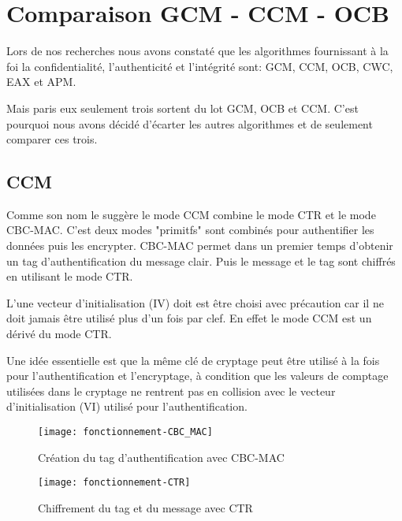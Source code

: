 \chapter{Comparaison GCM - CCM - OCB}

Lors de nos recherches nous avons constaté que les algorithmes fournissant à la foi la confidentialité, l'authenticité et l'intégrité sont: GCM, CCM, OCB, CWC, EAX et APM.

Mais paris eux seulement trois sortent du lot GCM, OCB et CCM. C'est pourquoi nous avons décidé d'écarter les autres algorithmes et de seulement comparer ces trois.

\section{CCM}

Comme son nom le suggère le mode CCM combine le mode CTR et le mode CBC-MAC. C'est deux modes "primitfs" sont combinés pour authentifier les données puis les encrypter. CBC-MAC permet dans un premier temps d'obtenir un tag d'authentification du message clair. Puis le message et le tag sont chiffrés en utilisant le mode CTR.



L'une vecteur d'initialisation (IV) doit est être choisi avec précaution car il ne doit jamais être utilisé plus d'un fois par clef. En effet le mode CCM est un dérivé du mode CTR.



Une idée essentielle est que la même clé de cryptage peut être utilisé à la fois pour l'authentification et l'encryptage, à condition que les valeurs de comptage utilisées dans le cryptage ne rentrent pas en collision avec le vecteur d'initialisation (VI) utilisé pour l'authentification.


\begin{figure}[!h]
  \centering
  \texttt{[image: fonctionnement-CBC\_MAC]}
  \caption{Création du tag d'authentification avec CBC-MAC}
  \label{Création du tag d'authentification avec CBC-MAC}
\end{figure}

\begin{figure}[!h]
  \centering
  \texttt{[image: fonctionnement-CTR]}
  \caption{Chiffrement du tag et du message avec CTR}
  \label{Chiffrement du tag et du message avec CTR}
\end{figure}

\newpage


